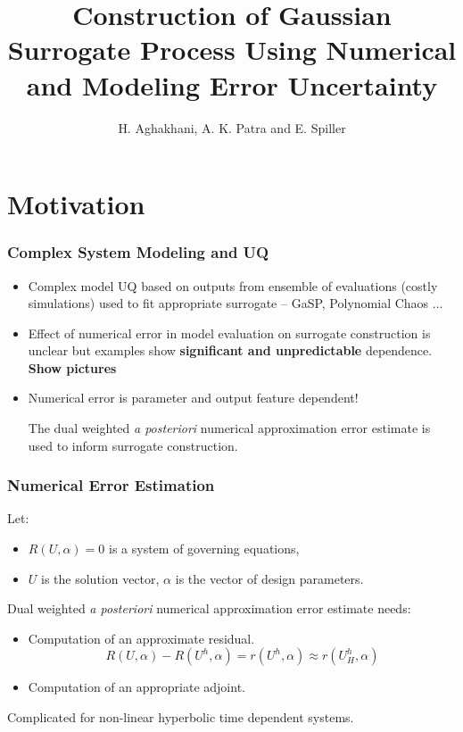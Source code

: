 \documentclass{beamer}
\begin{document}
\author[]{H. Aghakhani, A. K. Patra and E. Spiller}
\title{Construction of Gaussian
Surrogate Process Using Numerical
and Modeling Error Uncertainty}

\frame{\titlepage} 
\section{Motivation}
\begin{frame} \frametitle{Complex System Modeling and UQ}
\begin{itemize}
\item Complex  model UQ based on outputs from ensemble of evaluations (costly simulations) used to fit appropriate surrogate -- GaSP, Polynomial Chaos ...
\item Effect of numerical error in model evaluation on surrogate construction is  unclear but examples show {\bf significant and unpredictable} dependence. {\bf Show pictures}
\item Numerical error is   parameter and output feature dependent!

\hyperlink{supplemental}{}
\pause

\begin{tcolorbox}[colback=blue!5,colframe=blue!75!black,title=Use {\em a posteriori} error estimates]
 The dual weighted {\em a posteriori} numerical approximation error estimate is used to inform  surrogate construction. 
\end{tcolorbox}


\end{itemize}

\end{frame}
\begin{frame} \frametitle{Numerical Error Estimation}
Let:
\begin{itemize}
\item $R(U,\alpha)=0$ is a system of governing equations,
\item $U$ is the solution vector, 
$\alpha$ is the vector of design parameters.
\end{itemize}

Dual weighted {\em a posteriori} numerical approximation error estimate needs:
\begin{itemize}
\item Computation of an approximate residual. 
\[
R(U,\alpha) - R(U^h,\alpha)=r(U^h,\alpha) \approx r(U^h_H,\alpha)
\]

\item Computation of an appropriate adjoint.
\end{itemize}


Complicated for non-linear hyperbolic time dependent systems.
\end{frame}
\end{document}
